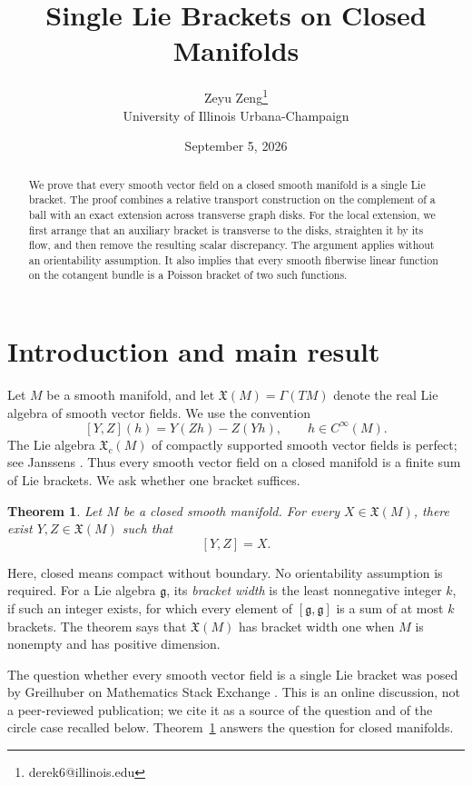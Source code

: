 \documentclass[11pt]{article}
\title{Single Lie Brackets on Closed Manifolds}
\author{Zeyu Zeng\thanks{derek6@illinois.edu} \\[3pt]
\small University of Illinois Urbana-Champaign}
\date{September 5, 2026}
\newtheorem{theorem}{Theorem}[section]
\theoremstyle{remark}
\begin{document}
\maketitle
\begin{abstract}
We prove that every smooth vector field on a closed smooth manifold is a single Lie bracket. The proof combines a relative transport construction on the complement of a ball with an exact extension across transverse graph disks. For the local extension, we first arrange that an auxiliary bracket is transverse to the disks, straighten it by its flow, and then remove the resulting scalar discrepancy. The argument applies without an orientability assumption. It also implies that every smooth fiberwise linear function on the cotangent bundle is a Poisson bracket of two such functions.
\end{abstract}

\section{Introduction and main result}
\label{sec:introduction}

Let $M$ be a smooth manifold, and let $\mathfrak{X}(M)=\Gamma(TM)$ denote the real Lie algebra of smooth vector fields. We use the convention
$$
    [Y,Z](h)=Y(Zh)-Z(Yh),
    \qquad h\in C^\infty(M).
$$
The Lie algebra $\mathfrak{X}_c(M)$ of compactly supported smooth vector fields is perfect; see Janssens \cite[Corollary~1]{Janssens2016}. Thus every smooth vector field on a closed manifold is a finite sum of Lie brackets. We ask whether one bracket suffices.

\begin{theorem}
\label{thm:main}
Let $M$ be a closed smooth manifold. For every
$X\in\mathfrak{X}(M)$, there exist
$Y,Z\in\mathfrak{X}(M)$ such that
$$
    [Y,Z]=X.
$$
\end{theorem}

Here, closed means compact without boundary. No orientability assumption is required. For a Lie algebra $\mathfrak{g}$, its \emph{bracket width} is the least nonnegative integer $k$, if such an integer exists, for which every element of $[\mathfrak{g},\mathfrak{g}]$ is a sum of at most $k$ brackets. The theorem says that $\mathfrak{X}(M)$ has bracket width one when $M$ is nonempty and has positive dimension.

The question whether every smooth vector field is a single Lie bracket was posed by Greilhuber on Mathematics Stack Exchange \cite{Greilhuber2021}. This is an online discussion, not a peer-reviewed publication; we cite it as a source of the question and of the circle case recalled below. Theorem~\ref{thm:main} answers the question for closed manifolds.
\end{document}
